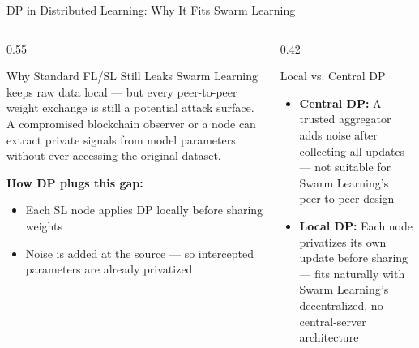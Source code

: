 \documentclass[aspectratio=169]{beamer}
\begin{document}
\begin{frame}{DP in Distributed Learning: Why It Fits Swarm Learning}
    \begin{columns}[T]
        \begin{column}{0.55\textwidth}
            \begin{block}{Why Standard FL/SL Still Leaks}
                Swarm Learning keeps raw data local — but every peer-to-peer weight exchange is still a potential attack surface. A compromised blockchain observer or a node can extract private signals from model parameters without ever accessing the original dataset.
            \end{block}
            \vspace{0.3cm}
            \textbf{How DP plugs this gap:}
            \begin{itemize}
                \item Each SL node applies DP locally before sharing weights
                \item Noise is added at the source — so intercepted parameters are already privatized
            \end{itemize}
        \end{column}
        \begin{column}{0.42\textwidth}
            \begin{block}{Local vs. Central DP}
                \begin{itemize}
                    \item \textbf{Central DP:} A trusted aggregator adds noise after collecting all updates — not suitable for Swarm Learning's peer-to-peer design
                    \item \textbf{Local DP:} Each node privatizes its own update before sharing — fits naturally with Swarm Learning's decentralized, no-central-server architecture
                \end{itemize}
            \end{block}
        \end{column}
    \end{columns}
\end{frame}
\end{document}
